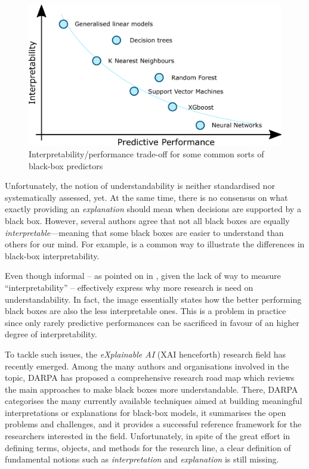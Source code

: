 \documentclass[12pt,a4paper,openright,twoside]{book}
\begin{document}
\begin{figure}
	\centering
	\includegraphics[width=.5\linewidth]{figures/interpretability-performance-tradeoff}
	\caption[Interpretability/performance trade-off]{Interpretability/performance trade-off for some common sorts of black-box predictors}
	\label{fig:tradeoff}
\end{figure}

Unfortunately, the notion of understandability is neither standardised nor systematically assessed, yet.
%
At the same time, there is no consensus on what exactly providing an \emph{explanation} should mean when decisions are supported by a black box.
%
However, several authors agree that not all black boxes are equally \emph{interpretable}---meaning that some black boxes are easier to understand than others for our mind.
%
For example,  is a common way to illustrate the differences in black-box interpretability.

Even though informal -- as pointed on in \cite{Rudin2019}, given the lack of way to measure ``interpretability'' --  effectively express why more research is need on understandability.
%
In fact, the image essentially states how the better performing black boxes are also the less interpretable ones.
%
This is a problem in practice since only rarely predictive performances can be sacrificed in favour of an higher degree of interpretability.

To tackle such issues, the \emph{eXplainable AI} (XAI henceforth) research field has recently emerged.
%
Among the many authors and organisations involved in the topic, DARPA has proposed a comprehensive research road map \cite{darpa2016-xai} which reviews the main approaches to make black boxes more understandable.
%
There, DARPA categorises the many currently available techniques aimed at building meaningful interpretations or explanations for black-box models, it summarises the open problems and challenges, and it provides a successful reference framework for the researchers interested in the field.
%
Unfortunately, in spite of the great effort in defining terms, objects, and methods for the research line, a clear definition of fundamental notions such as \emph{interpretation} and \emph{explanation} is still missing.
\end{document}
